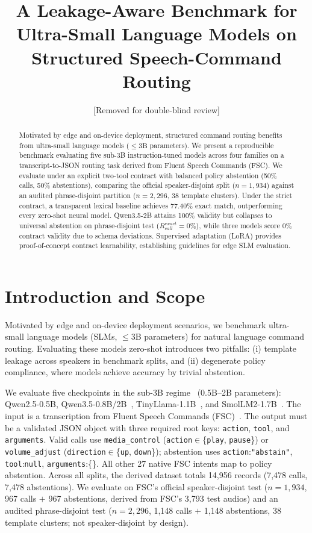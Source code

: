 \documentclass[12pt]{article}
\title{A Leakage-Aware Benchmark for Ultra-Small Language Models on\\
Structured Speech-Command Routing}
\author{[Removed for double-blind review]}
\begin{document}
\maketitle

\begin{abstract}\sloppy
Motivated by edge and on-device deployment, structured command routing benefits from ultra-small language models ($\le 3\text{B}$ parameters). We present a reproducible benchmark evaluating five sub-3B instruction-tuned models across four families on a transcript-to-JSON routing task derived from Fluent Speech Commands (FSC). We evaluate under an explicit two-tool contract with balanced policy abstention (50\% calls, 50\% abstentions), comparing the official speaker-disjoint split ($n=1{,}934$) against an audited phrase-disjoint partition ($n=2{,}296$, 38 template clusters). Under the strict contract, a transparent lexical baseline achieves 77.40\% exact match, outperforming every zero-shot neural model. Qwen3.5-2B attains 100\% validity but collapses to universal abstention on phrase-disjoint test ($R_{call}^{exact}=0\%$), while three models score 0\% contract validity due to schema deviations. Supervised adaptation (LoRA) provides proof-of-concept contract learnability, establishing guidelines for edge SLM evaluation.
\end{abstract}

\section{Introduction and Scope}

Motivated by edge and on-device deployment scenarios, we benchmark ultra-small language models (SLMs, $\le 3$B parameters) for natural language command routing. Evaluating these models zero-shot introduces two pitfalls: (i) template leakage across speakers in benchmark splits, and (ii) degenerate policy compliance, where models achieve accuracy by trivial abstention.

{\sloppy We evaluate five checkpoints in the sub-3B regime~\cite{liu2024mobilellm} (0.5B--2B parameters): Qwen2.5-0.5B, Qwen3.5-0.8B/2B~\cite{qwen35}, TinyLlama-1.1B~\cite{tinyllama2024}, and SmolLM2-1.7B~\cite{smollm2025}. The input is a transcription from Fluent Speech Commands (FSC)~\cite{lugosch2019}. The output must be a validated JSON object with three required root keys: \texttt{action}, \texttt{tool}, and \texttt{arguments}. Valid calls use \texttt{media\_control} (\texttt{action}$\in$\{\texttt{play}, \texttt{pause}\}) or \texttt{volume\_adjust} (\texttt{direction}$\in$\{\texttt{up}, \texttt{down}\}); abstention uses \texttt{action}:\texttt{"abstain"}, \texttt{tool}:\texttt{null}, \texttt{arguments}:\{\}. All other 27 native FSC intents map to policy abstention. Across all splits, the derived dataset totals 14{,}956 records (7{,}478 calls, 7{,}478 abstentions). We evaluate on FSC's official speaker-disjoint test ($n=1{,}934$, 967 calls $+$ 967 abstentions, derived from FSC's 3,793 test audios) and an audited phrase-disjoint test ($n=2{,}296$, 1,148 calls $+$ 1,148 abstentions, 38 template clusters; not speaker-disjoint by design).}\par
\end{document}
